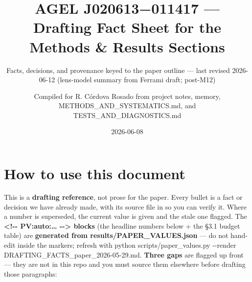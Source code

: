 \documentclass[
]{article}
\title{AGEL J020613−011417 --- Drafting Fact Sheet for the Methods \&
Results Sections}
\subtitle{Facts, decisions, and provenance keyed to the paper outline
--- last revised 2026-06-12 (lens-model summary from Ferrami draft;
post-M12)}
\author{Compiled for R. Córdova Rosado from project notes, memory,
METHODS\_AND\_SYSTEMATICS.md, and TESTS\_AND\_DIAGNOSTICS.md}
\date{2026-06-08}
\newcommand{\BreakablePath}[1]{{\ttfamily\sloppy #1}}
\begin{document}
\maketitle

\hypertarget{how-to-use-this-document}{%
\section{How to use this document}\label{how-to-use-this-document}}

This is a \textbf{drafting reference}, not prose for the paper. Every
bullet is a fact or decision we have already made, with its source file
in \BreakablePath{[brackets]} so you can verify it. Where a number is
superseded, the current value is given and the stale one flagged. The
\textbf{\BreakablePath{<!-\discretionary{}{}{}-\discretionary{}{}{} PV:auto:… -\discretionary{}{}{}-\discretionary{}{}{}>}
blocks} (the headline numbers below + the §3.1 budget table) are
\textbf{generated from
\BreakablePath{results/\discretionary{}{}{}PAPER\_\discretionary{}{}{}VALUES.\discretionary{}{}{}json}}
--- do not hand-edit inside the markers; refresh with
\BreakablePath{python scripts/\discretionary{}{}{}paper\_\discretionary{}{}{}values.\discretionary{}{}{}py -\discretionary{}{}{}-\discretionary{}{}{}render DRAFTING\_\discretionary{}{}{}FACTS\_\discretionary{}{}{}paper\_\discretionary{}{}{}2026-\discretionary{}{}{}05-\discretionary{}{}{}29.\discretionary{}{}{}md}.
\textbf{Three gaps} are flagged up front --- they are not in this repo
and you must source them elsewhere before drafting those paragraphs:
\end{document}
